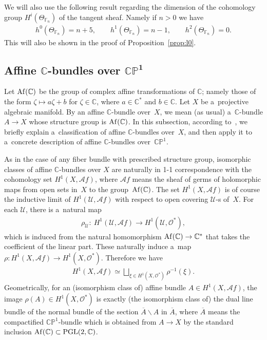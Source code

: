 \documentclass[pdftex]{sigma}
\numberwithin{equation}{section}
\begin{document}
We will also use the following result regarding the dimension of the cohomology group $H^i(\Theta_{\mathbb{F}_n})$ of
the tangent sheaf.
Namely if $n>0$ we have \cite{MKbook}
\begin{gather}
\label{cohohir}
h^0(\Theta_{\mathbb{F}_n}) = n + 5,
\qquad
h^1(\Theta_{\mathbb{F}_n}) = n - 1,
\qquad
h^2(\Theta_{\mathbb{F}_n}) = 0.
\end{gather}
This will also be shown in the proof of Proposition~\ref{prop:l0}.


\subsection[Af\/f\/ine $\mathbb{C}$-bundles over $\mathbb{CP}^1$]{Af\/f\/ine
$\boldsymbol{\mathbb{C}}$-bundles over $\boldsymbol{\mathbb{CP}^1}$}
\label{ss:ab}

Let ${\rm Af}(\mathbb{C})$ be the group of complex af\/f\/ine transformations of $\mathbb{C}$; namely those of the form
$\zeta\mapsto a\zeta + b$ for $\zeta\in \mathbb{C}$, where $a\in \mathbb{C}^*$ and $b\in \mathbb{C}$.
Let $X$ be a~projective algebraic manifold.
By an af\/f\/ine $\mathbb{C}$-bundle over~$X$, we mean (as usual) a~$\mathbb{C}$-bundle $A\to X$ whose structure group
is ${\rm {Af}}(\mathbb{C})$.
In this subsection, according to~\cite{At55}, we brief\/ly explain a~classif\/ication of af\/f\/ine $\mathbb{C}$-bundles
over~$X$, and then apply it to a~concrete description of af\/f\/ine $\mathbb{C}$-bundles over~$\mathbb{CP}^1$.

As in the case of any f\/iber bundle with prescribed structure group, isomorphic classes of af\/f\/ine
$\mathbb{C}$-bundles over $X$ are naturally in 1-1 correspondence with the cohomology set $H^1(X, \mathscr {A}f)$, where
$\mathscr {A}f$ means the sheaf of germs of holomorphic maps from open sets in~$X$ to the group~${\rm{Af}}(\mathbb{C})$.
The set $H^1(X, \mathscr {A}f)$ is of course the inductive limit of $H^1(\mathscr U,\mathscr Af)$ with respect to open
covering $\mathscr U$-s of~$X$.
For each $\mathscr U$, there is a~natural map
\begin{gather*}
\rho_{\mathscr U}: \ H^1(\mathscr U,{\mathscr A}f)
 \longrightarrow
H^1(\mathscr U,\mathscr O^*),
\end{gather*}
which is induced from the natural homomorphism $ {\rm {Af}}(\mathbb{C})\to \mathbb{C}^*$ that takes the coef\/f\/icient
of the linear part.
These naturally induce a~map $\rho:H^1(X, \mathscr Af)\to H^1(X,\mathscr O^*)$.
Therefore we have
\begin{gather}
\label{star1}
H^1(X,\mathscr Af) \simeq \bigsqcup_{\xi \in H^1(X,\mathscr O^*)}\rho^{-1}(\xi).
\end{gather}
Geometrically, for an (isomorphism class of) af\/f\/ine bundle $A\in H^1(X,\mathscr Af)$, the image $\rho(A)\in
H^1(X,\mathscr O^*)$ is exactly (the isomorphism class of) the dual line bundle of the normal bundle of the section
$\overline A \backslash A$ in $\overline A$, where $\overline A$ means the compactif\/ied $\mathbb{CP}^1$-bundle which
is obtained from $A\to X$ by the standard inclusion ${\rm Af}(\mathbb{C})\subset\mathrm{PGL}(2,\mathbb{C})$.
\end{document}
